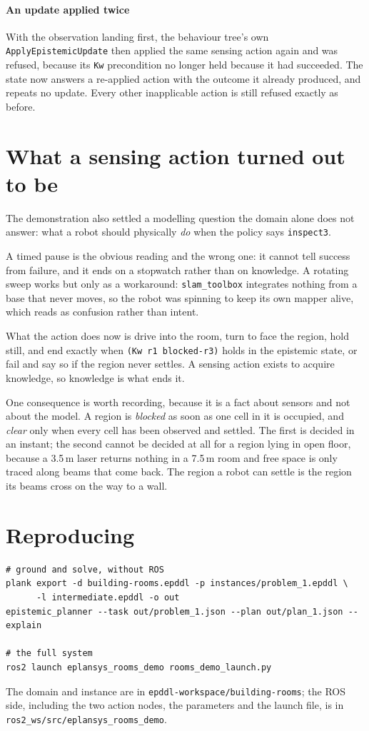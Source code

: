 \documentclass[11pt,a4paper]{article}
\theoremstyle{definition}
\newcommand{\code}[1]{\texttt{\small #1}}
\begin{document}
\paragraph{An update applied twice} With the observation landing first, the
behaviour tree's own \code{ApplyEpistemicUpdate} then applied the same sensing
action again and was refused, because its \code{Kw} precondition no longer held
because it had succeeded. The state now answers a re-applied action with the
outcome it already produced, and repeats no update. Every other inapplicable
action is still refused exactly as before.

\section{What a sensing action turned out to be}

The demonstration also settled a modelling question the domain alone does not
answer: what a robot should physically \emph{do} when the policy says
\code{inspect3}.

A timed pause is the obvious reading and the wrong one: it cannot tell
success from failure, and it ends on a stopwatch rather than on knowledge. A
rotating sweep works but only as a workaround: \code{slam\_toolbox} integrates
nothing from a base that never moves, so the robot was spinning to keep its own
mapper alive, which reads as confusion rather than intent.

What the action does now is drive into the room, turn to face the region, hold
still, and end exactly when \code{(Kw r1 blocked-r3)} holds in the epistemic
state, or fail and say so if the region never settles. A sensing action
exists to acquire knowledge, so knowledge is what ends it.

One consequence is worth recording, because it is a fact about sensors and not
about the model. A region is \emph{blocked} as soon as one cell in it is
occupied, and \emph{clear} only when every cell has been observed and settled.
The first is decided in an instant; the second cannot be decided at all for a
region lying in open floor, because a 3.5\,m laser returns nothing in a
7.5\,m room and free space is only traced along beams that come back. The
region a robot can settle is the region its beams cross on the way to a wall.

\section{Reproducing}

\begin{lstlisting}
# ground and solve, without ROS
plank export -d building-rooms.epddl -p instances/problem_1.epddl \
      -l intermediate.epddl -o out
epistemic_planner --task out/problem_1.json --plan out/plan_1.json --explain

# the full system
ros2 launch eplansys_rooms_demo rooms_demo_launch.py
\end{lstlisting}

The domain and instance are in \code{epddl-workspace/building-rooms}; the ROS
side, including the two action nodes, the parameters and the launch file, is in
\code{ros2\_ws/src/eplansys\_rooms\_demo}.
\end{document}
